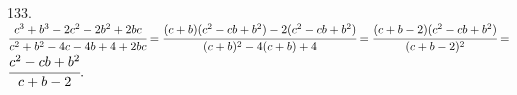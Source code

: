 133. $\cfrac{c^3+b^3-2c^2-2b^2+2bc}{c^2+b^2-4c-4b+4+2bc}=\cfrac{(c+b)(c^2-cb+b^2)-2(c^2-cb+b^2)}{(c+b)^2-4(c+b)+4}=
\cfrac{(c+b-2)(c^2-cb+b^2)}{(c+b-2)^2}=$\\$\cfrac{c^2-cb+b^2}{c+b-2}.$\\
